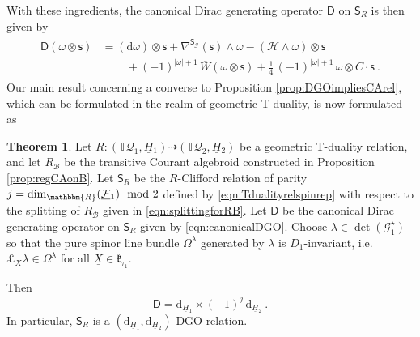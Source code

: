 \documentclass[a4paper, reqno, 11pt]{amsart}
\numberwithin{equation}{section}
\theoremstyle{definition}
\newtheorem{theorem}[equation]{Theorem}
\newcommand{\red}[1]{\underline{#1}}
\newcommand{\frk}[1]{\mathfrak{#1}}
\newcommand{\de}{\mathrm{d}}
\newcommand{\IR}{\mathbbm{R}}
\newcommand{\IT}{\mathbb{T}}
\newcommand{\cB}{{\mathcal B}}
\newcommand{\cH}{{\mathcal H}}
\newcommand{\cQ}{{\mathcal Q}}
\newcommand{\cF}{{\mathcal F}}
\newcommand{\ccG}{{\mathscr G}}
\newcommand{\sfD}{{\mathsf{D}}}
\newcommand{\sfS}{{\mathsf{S}}}
\newcommand{\sfs}{{\mathsf{s}}}
\newcommand{\rel}{\dashrightarrow}
\theoremstyle{remark}
\begin{document}
With these ingredients, the canonical Dirac generating operator $\sfD$ on $\sfS_R$ is then given by \cite[Theorem 61]{Cortes:2019roa}
\begin{align}
\begin{aligned}\label{eqn:canonicalDGO}
    \sfD(\omega\otimes \sfs) &=
    (\de \omega) \otimes \sfs + \nabla^{\sfS_\ccG}(\sfs) \wedge \omega - (\cH \wedge \omega) \otimes \sfs \\
    & \qquad \, + (-1)^{|\omega|+1}\, \overline{W}(\omega \otimes \sfs) + \tfrac 14\,(-1)^{|\omega|+1}\, \omega \otimes C\cdot\sfs \ .
\end{aligned}
\end{align}
Our main result concerning a converse to Proposition \ref{prop:DGOimpliesCArel}, which can be formulated in the realm of geometric T-duality, is now formulated as

\begin{theorem}\label{prop:canonicalDGOforR}
Let $R\colon (\IT \cQ_1, \red H{}_1) \rel (\IT \cQ_2, \red H{}_2)$ be a geometric T-duality relation, and let $R_\cB$ be the transitive Courant algebroid constructed in Proposition \ref{prop:regCAonB}. Let $\sfS_R$ be the $R$-Clifford relation of  parity $j=\dim_\IR(\red\cF{}_1)\mod 2$ defined by \eqref{eqn:Tdualityrelspinrep} with respect to the splitting of $R_\cB$ given in \eqref{eqn:splittingforRB}.
Let $\sfD$ be the canonical Dirac generating operator on $\sfS_R$ given by \eqref{eqn:canonicalDGO}. Choose $\lambda\in \det(\ccG^\star_1)$ so that the pure spinor line bundle $\Omega^\lambda$ generated by $\lambda$ is $D_1$-invariant, i.e. $\pounds_{\red X} \lambda \in \Omega^\lambda$ for all $\red X\in \frk{k}_{\tau_1}$. 

Then $$\sfD = \de_{\red H{}_1}\times(-1)^j\, \de_{\red H{}_2} \ . $$  In particular, $\sfS_R$ is a $(\de_{\red H{}_1}, \de_{\red H{}_2})$-DGO relation.
\end{theorem}
\end{document}
